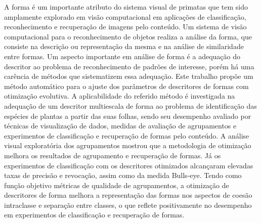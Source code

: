 A forma é um importante atributo do sistema visual de primatas que tem sido amplamente explorado em visão computacional em aplicações de classificação, reconhecimento e recuperação de imagens pelo conteúdo. Um sistema de visão computacional para o reconhecimento de objetos realiza 
a análise da forma, que consiste na descrição ou representação da mesma e na análise 
de similaridade entre formas. Um aspecto importante em análise de forma é a adequação
do descritor ao problema de reconhecimento de padrões de interesse, porém há uma carência de métodos que sistematizem essa adequação. Este trabalho propõe um método automático para o ajuste dos parâmetros
de descritores de formas com otimização evolutiva. A aplicabilidade do referido método é investigada na adequação de um descritor multiescala de 
forma ao problema de identificação das espécies de plantas a partir das suas folhas, sendo seu desempenho avaliado por técnicas de visualização de dados, 
medidas de avaliação de agrupamentos e experimentos de classificação e recuperação de formas pelo conteúdo. A análise visual exploratória dos agrupamentos mostrou 
que a metodologia de otimização melhora os resultados de agrupamento e recuperação de formas. Já os experimentos de classificação com os descritores otimizados alcançaram elevadas
taxas de precisão e revocação, assim como da medida Bulls-eye. Tendo como função objetivo métricas de qualidade de
agrupamentos, a otimização de descritores de forma melhora a representação das formas nos aspectos de coesão intraclasse e separação entre classes, o que reflete positivamente no desempenho em experimentos de classificação e recuperação de formas.
